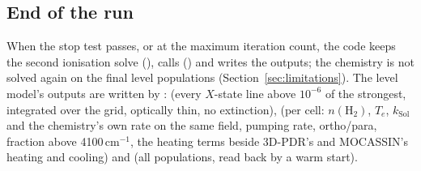 \subsection{End of the run}

When the stop test passes, or at the maximum iteration count, the code keeps
the second ionisation solve (), calls
 () and writes
the outputs; the chemistry is not solved again on the final level populations
(Section~\ref{sec:limitations}). The level model's outputs are written by
:  (every \Htwo{} $X$-state
line above $10^{-6}$ of the strongest, integrated over the grid, optically
thin, no extinction),  (per cell: $n(\mathrm{H_2})$,
$T_e$, $k_{\mathrm{Sol}}$ and the chemistry's own rate on the same field, pumping
rate, ortho/para, fraction above 4100\,cm$^{-1}$, the \Htwo{} heating terms beside
3D-PDR's and MOCASSIN's heating and cooling) and  (all
populations, read back by a warm start).
